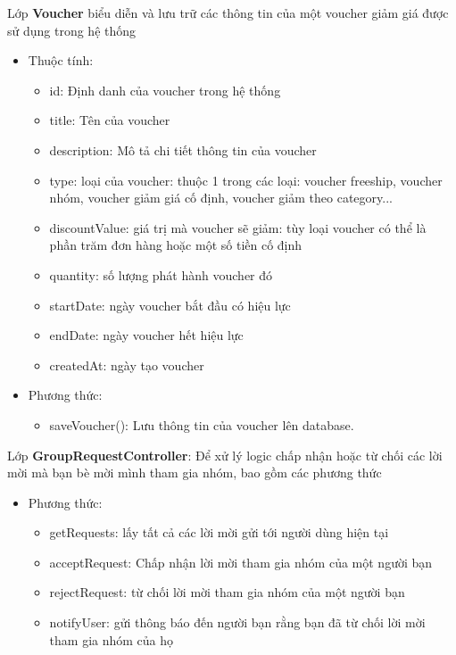 \documentclass[../DoAn.tex]{subfiles}
\begin{document}
Lớp \textbf{Voucher} biểu diễn và lưu trữ các thông tin của một voucher giảm giá được sử dụng trong hệ thống
    \begin{itemize}
        \item Thuộc tính:
            \begin{itemize}
                \item id: Định danh của voucher trong hệ thống
                \item title: Tên của voucher
                \item description: Mô tả chi tiết thông tin của voucher
                \item type: loại của voucher: thuộc 1 trong các loại: voucher freeship, voucher nhóm, voucher giảm giá cố định, voucher giảm theo category... 
                \item discountValue: giá trị mà voucher sẽ giảm: tùy loại voucher có thể là phần trăm đơn hàng hoặc một số tiền cố định
                \item quantity: số lượng phát hành voucher đó
                \item startDate: ngày voucher bắt đầu có hiệu lực
                \item endDate: ngày voucher hết hiệu lực
                \item createdAt: ngày tạo voucher
            \end{itemize}
        \item Phương thức:
            \begin{itemize}
                \item saveVoucher(): Lưu thông tin của voucher lên database.
            \end{itemize}
    \end{itemize}
    
Lớp \textbf{GroupRequestController}: Để xử lý logic chấp nhận hoặc từ chối các lời mời mà bạn bè mời mình tham gia nhóm, bao gồm các phương thức
    \begin{itemize}
        \item Phương thức:
            \begin{itemize}
                \item getRequests: lấy tất cả các lời mời gửi tới người dùng hiện tại
                \item acceptRequest: Chấp nhận lời mời tham gia nhóm của một người bạn
                \item rejectRequest: từ chối lời mời tham gia nhóm của một người bạn
                \item notifyUser: gửi thông báo đến người bạn rằng bạn đã từ chối lời mời tham gia nhóm của họ
            \end{itemize}
    \end{itemize}
    
\end{document}
